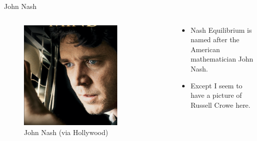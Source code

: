 \documentclass[
  14pt,
  letterpaper,
  ignorenonframetext,
  aspectratio=169,
]{beamer}
\providecommand{\tightlist}{%
  \setlength{\itemsep}{0pt}\setlength{\parskip}{0pt}}\usepackage{longtable,booktabs,array}
\let\olditem\item
\renewcommand{\item}{%
\olditem\vspace{6pt}}
\begin{document}
\begin{frame}{John Nash}
\protect\hypertarget{john-nash}{}
\begin{columns}[c]
\begin{column}{0.48\textwidth}
\begin{figure}

{\centering \includegraphics[width=0.75\textwidth,height=0.75\textheight]{images/crowe.png}

}

\caption{John Nash (via Hollywood)}

\end{figure}
\end{column}

\begin{column}{0.48\textwidth}
\begin{itemize}[<+->]
\tightlist
\item
  Nash Equilibrium is named after the American mathematician John Nash.
\item
  Except I seem to have a picture of Russell Crowe here.
\end{itemize}
\end{column}
\end{columns}
\end{frame}
\end{document}
